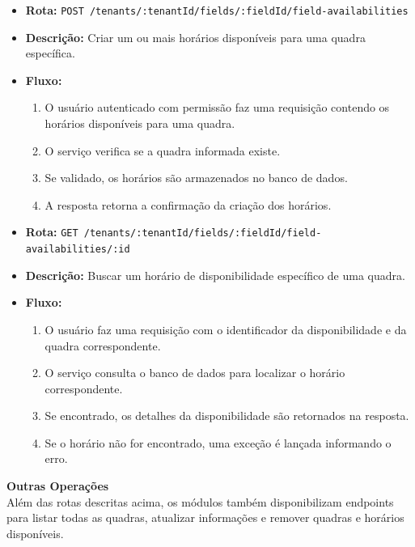 \begin{itemize}
    \item \textbf{Rota:} \texttt{POST /tenants/:tenantId/fields/:fieldId/field-availabilities}
    \item \textbf{Descrição:} Criar um ou mais horários disponíveis para uma quadra específica.
    \item \textbf{Fluxo:}
    \begin{enumerate}
        \item O usuário autenticado com permissão faz uma requisição contendo os horários disponíveis para uma quadra.
        \item O serviço verifica se a quadra informada existe.
        \item Se validado, os horários são armazenados no banco de dados.
        \item A resposta retorna a confirmação da criação dos horários.
    \end{enumerate}
\end{itemize}

\begin{itemize}
    \item \textbf{Rota:} \texttt{GET /tenants/:tenantId/fields/:fieldId/field-availabilities/:id}
    \item \textbf{Descrição:} Buscar um horário de disponibilidade específico de uma quadra.
    \item \textbf{Fluxo:}
    \begin{enumerate}
        \item O usuário faz uma requisição com o identificador da disponibilidade e da quadra correspondente.
        \item O serviço consulta o banco de dados para localizar o horário correspondente.
        \item Se encontrado, os detalhes da disponibilidade são retornados na resposta.
        \item Se o horário não for encontrado, uma exceção é lançada informando o erro.
    \end{enumerate}
\end{itemize}

\noindent\textbf{Outras Operações}\\
Além das rotas descritas acima, os módulos também disponibilizam endpoints para listar todas as quadras, atualizar informações e remover quadras e horários disponíveis.

